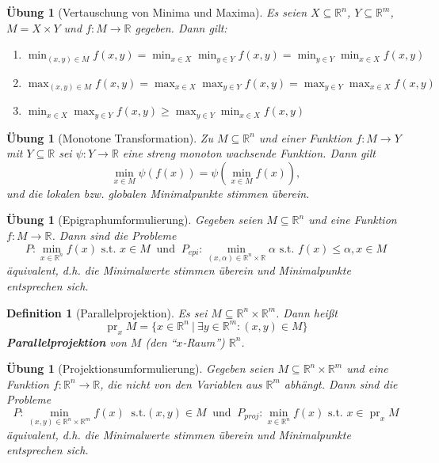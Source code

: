 \documentclass[11pt]{scrreprt}
\newcounter{thm}
\theoremstyle{thmstyle}
\numberwithin{thm}{section}
\newtheorem{definition}[thm]{Definition}
\newtheorem{uebung}[thm]{Übung}
\begin{document}
\begin{uebung}[Vertauschung von Minima und Maxima]
	Es seien $X \subseteq \mathbb{R}^n$, $Y \subseteq \mathbb{R}^m$, $M = X \times Y$ und $f \colon M \rightarrow \mathbb{R}$ gegeben. Dann gilt:
	\begin{enumerate}[label=\alph*\upshape)]
		\item $\min_{(x,y) \in M} f(x, y) = \min_{x \in X} \min_{y \in Y} f(x,y) = \min_{y \in Y} \min_{x \in X} f(x, y)$
		\item $\max_{(x,y) \in M} f(x, y) = \max_{x \in X} \max_{y \in Y} f(x,y) = \max_{y \in Y} \max_{x \in X} f(x, y)$
		\item $\min_{x \in X} \max_{y \in Y} f(x, y) \geq \max_{y \in Y} \min_{x \in X} f(x, y)$
	\end{enumerate}
\end{uebung}

\begin{uebung}[Monotone Transformation]
	Zu $M \subseteq \mathbb{R}^n$ und einer Funktion $f \colon M \rightarrow Y$ mit $Y\subseteq \mathbb{R}$ sei $\psi \colon Y \rightarrow \mathbb{R}$ eine streng monoton wachsende Funktion. Dann gilt
	$$ \min_{x \in M} \psi \left( f(x) \right) = \psi \left( \min_{x \in M} f(x) \right), $$
	und die lokalen bzw. globalen Minimalpunkte stimmen überein.
\end{uebung}

\begin{uebung}[Epigraphumformulierung]
	Gegeben seien $M \subseteq \mathbb{R}^n$ und eine Funktion $f \colon M \rightarrow \mathbb{R}$. Dann sind die Probleme
	$$ P \colon \min_{x \in \mathbb{R}^n} f(x) \text{ s.t. } x \in M ~\text{ und } ~ P_{epi} \colon \min_{(x, \alpha) \in \mathbb{R}^n \times \mathbb{R}} \alpha \text{ s.t. } f(x) \leq \alpha, x \in M $$
	äquivalent, d.h. die Minimalwerte stimmen überein und Minimalpunkte entsprechen sich.
\end{uebung}

\begin{definition}[Parallelprojektion]
	Es sei $M \subseteq \mathbb{R}^n \times \mathbb{R}^m$. Dann heißt
	$$ \operatorname{pr}_x M = \big\{ x \in \mathbb{R}^n ~|~\exists y \in \mathbb{R}^m : (x, y) \in M \big\} $$
	\textbf{Parallelprojektion} von $M$ (den \enquote{$x$-Raum}) $\mathbb{R}^n$.
\end{definition}

\begin{uebung}[Projektionsumformulierung]
	Gegeben seien $M \subseteq \mathbb{R}^n \times \mathbb{R}^m$ und eine Funktion $f \colon \mathbb{R}^n \rightarrow \mathbb{R}$, die nicht von den Variablen aus $\mathbb{R}^m$ abhängt. Dann sind die Probleme 
	$$ P \colon \min_{(x, y) \in \mathbb{R}^n \times \mathbb{R}^m} f(x) ~\text{ s.t.} (x, y) \in M ~\text{ und } ~ P_{proj} \colon \min_{x \in \mathbb{R}^n} f(x) \text{ s.t. } x \in \operatorname{pr}_x M $$
	äquivalent, d.h. die Minimalwerte stimmen überein und Minimalpunkte entsprechen sich.
\end{uebung}
\end{document}
